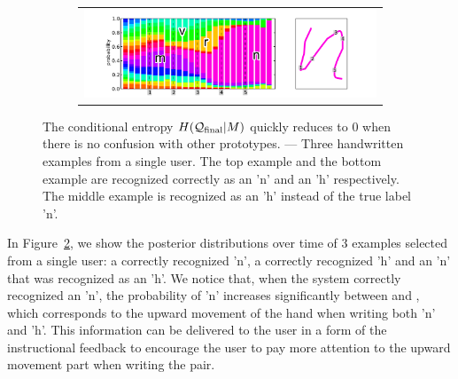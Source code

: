 \documentclass{sigchi}
\begin{document}
\begin{figure}[!p]
\begin{subfigure}[b]{0.45\textwidth}
\begin{tabular}{c}
      \includegraphics[width=\textwidth]{figures/best_l2.pdf}
    \end{tabular}
    \caption{}
    \label{fig:confusion}
  \end{subfigure}
  \caption{The conditional entropy $H(\mathcal{Q}_{\mathrm{final}} | M)$ quickly reduces to 0
    when there is no confusion with other prototypes.  --- Three
    handwritten examples from a single user. The top example and the
    bottom example are recognized correctly as an 'n' and an 'h'
    respectively. The middle example is recognized as an 'h' instead
    of the true label 'n'.}
\end{figure}

In Figure~\ref{fig:confusion}, we show the posterior distributions
over time of 3 examples selected from a single user: a correctly
recognized 'n', a correctly recognized 'h' and an 'n' that was
recognized as an 'h'. We notice that, when the system correctly
recognized an 'n', the probability of 'n' increases significantly
between  and , which corresponds to the upward
movement of the hand when writing both 'n' and 'h'. This information
can be delivered to the user in a form of the instructional feedback
to encourage the user to pay more attention to the upward movement part
when writing the pair.
\end{document}

